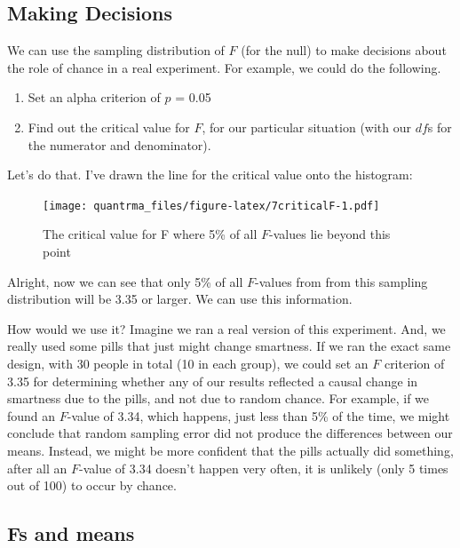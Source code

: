 \documentclass[
]{book}
\providecommand{\tightlist}{%
  \setlength{\itemsep}{0pt}\setlength{\parskip}{0pt}}
\begin{document}
\hypertarget{making-decisions}{%
\subsection{Making Decisions}\label{making-decisions}}

We can use the sampling distribution of \(F\) (for the null) to make decisions about the role of chance in a real experiment. For example, we could do the following.

\begin{enumerate}
\def\labelenumi{\arabic{enumi}.}
\tightlist
\item
  Set an alpha criterion of \(p\) = 0.05
\item
  Find out the critical value for \(F\), for our particular situation (with our \(df\)s for the numerator and denominator).
\end{enumerate}

Let's do that. I've drawn the line for the critical value onto the histogram:

\begin{figure}
\centering
\texttt{[image: quantrma\_files/figure-latex/7criticalF-1.pdf]}
\caption{\label{fig:7criticalF}The critical value for F where 5\% of all \(F\)-values lie beyond this point}
\end{figure}

Alright, now we can see that only 5\% of all \(F\)-values from from this sampling distribution will be 3.35 or larger. We can use this information.

How would we use it? Imagine we ran a real version of this experiment. And, we really used some pills that just might change smartness. If we ran the exact same design, with 30 people in total (10 in each group), we could set an \(F\) criterion of 3.35 for determining whether any of our results reflected a causal change in smartness due to the pills, and not due to random chance. For example, if we found an \(F\)-value of 3.34, which happens, just less than 5\% of the time, we might conclude that random sampling error did not produce the differences between our means. Instead, we might be more confident that the pills actually did something, after all an \(F\)-value of 3.34 doesn't happen very often, it is unlikely (only 5 times out of 100) to occur by chance.

\hypertarget{fs-and-means}{%
\subsection{Fs and means}\label{fs-and-means}}
\end{document}
